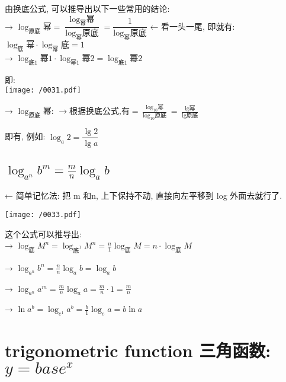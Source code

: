 \documentclass[UTF8]{ctexart}
\begin{document}
由换底公式, 可以推导出以下一些常用的结论: \\

→  $\log _{\text{原底}}\text{幂}=\dfrac{\log _{\text{幂}}\text{幂}}{\log _{\text{幂}}\text{原底}}=\dfrac{1}{\log _{\text{幂}}\text{原底}}$ 
← 看一头一尾, 即就有: $\boxed{\log _{\text{底}}\text{幂}\cdot \log _{\text{幂}}\text{底}=1}$
\\

→ $ \boxed{\log _{\text{底}1}\text{幂}1\cdot \log _{\text{幂}1}\text{幂}2=\log _{\text{底}1}\text{幂}2 }$

即: \\
\texttt{[image: /0031.pdf]}



→ $ \boxed{\log _{\text{原底}}\text{幂:\ }\rightarrow \text{根据换底公式,有}=\frac{\log _{10}\text{幂}}{\log _{10}\text{原底}}=\frac{\lg\text{幂}}{\lg\text{原底}}
}$

即有, 例如: $\log _a2=\dfrac{\lg 2}{\lg a} $



\dotfill



\subsection{$\log _{a^n}b^m=\frac{m}{n}\log _ab $}

← 简单记忆法: 把 m 和n, 上下保持不动, 直接向左平移到 log 外面去就行了. \\

\begin{myEnvSample}
\texttt{[image: /0033.pdf]}
\end{myEnvSample}



这个公式可以推导出: \\


→ $\log _{\text{底}}M^n=\log _{\text{底}^1}M^n=\frac{n}{1}\log _{\text{底}}M=n\cdot \log _{\text{底}}M $

→ $ \log _{a^n}b^n=\frac{n}{n}\log _ab=\log _ab$

→ $\log _{a^n}a^m=\frac{m}{n}\log _aa=\frac{m}{n}\cdot 1=\frac{m}{n} $


→ $\ln a^b=\log _{e^1}a^b=\frac{b}{1}\log _ea=b\ln a $





\section{trigonometric function 三角函数:  $ y=base^x $}
\end{document}
